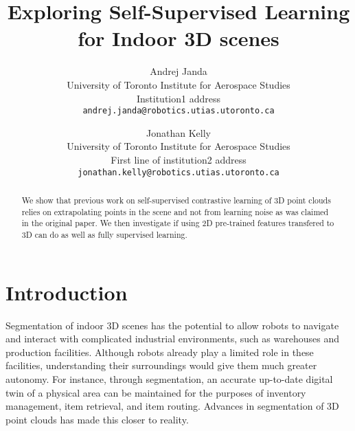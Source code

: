 \documentclass[10pt,twocolumn,letterpaper]{article}
\begin{document}
\title{Exploring Self-Supervised Learning for Indoor 3D scenes}

\author{Andrej Janda\\
University of Toronto Institute for Aerospace Studies\\
Institution1 address\\
{\tt\small andrej.janda@robotics.utias.utoronto.ca}
\and
Jonathan Kelly\\
University of Toronto Institute for Aerospace Studies\\
First line of institution2 address\\
{\tt\small jonathan.kelly@robotics.utias.utoronto.ca}
}
\maketitle

\begin{abstract}
    We show that previous work \cite{xie2020pointcontrast} on self-supervised contrastive learning of 3D point clouds relies on extrapolating points in the scene and not from learning noise as was claimed in the original paper. We then investigate if using 2D pre-trained features transfered to 3D can do as well as fully supervised learning.
\end{abstract}

\section{Introduction}
\label{sec:intro}

Segmentation of indoor 3D scenes has the potential to allow robots to navigate and interact with complicated industrial environments, such as warehouses and production facilities. Although robots already play a limited role in these facilities, understanding their surroundings would give them much greater autonomy. For instance, through segmentation, an accurate up-to-date digital twin of a physical area can be maintained for the purposes of inventory management, item retrieval, and item routing. Advances in segmentation of 3D point clouds \cite{choy20194d} has made this closer to reality.
\end{document}
